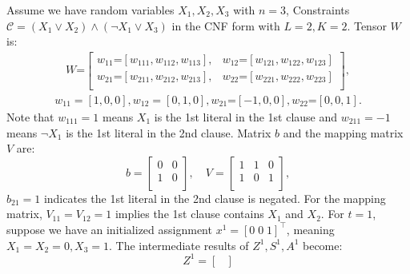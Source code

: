 \begin{example}\label{example:matrix}
    Assume we have random variables $X_1, X_2,X_3$ with $n=3$, Constraints $\mathcal{C}=(X_1\vee X_2)\wedge(\neg X_1 \vee X_3)$ in the CNF form with $L=2,K=2$.
    Tensor $W$ is:
    \begin{equation*}
        \begin{aligned}
            W\mbox{=}\begin{bmatrix}
                         w_{11}\mbox{=}[w_{111}, w_{112}, w_{113}], & w_{12}\mbox{=}[w_{121}, w_{122}, w_{123}] \\
                         w_{21}\mbox{=}[w_{211}, w_{212}, w_{213}], & w_{22}\mbox{=}[w_{221}, w_{222}, w_{223}] \\
                     \end{bmatrix},
        \end{aligned}
    \end{equation*}
    \begin{equation*}
        \begin{aligned}
            w_{11}=[1, 0, 0], w_{12}=[0, 1, 0],  w_{21}\mbox{=}[-1, 0, 0], w_{22}\mbox{=}[0 , 0, 1].
        \end{aligned}
    \end{equation*}
    Note that $w_{111}=1$ means $X_1$ is the 1st literal in the 1st clause and $w_{211}=-1$ means $\neg X_1$ is the 1st literal in the 2nd clause. %
    Matrix $b$ and the mapping matrix $V$ are:
    \begin{equation*}
        b=\begin{bmatrix}
            0 & 0 \\
            1 & 0 \\
        \end{bmatrix},\quad
        V=\begin{bmatrix}
            1 & 1 & 0 \\
            1 & 0 & 1 \\
        \end{bmatrix},
    \end{equation*}
    $b_{21}=1$ indicates the 1st literal in the 2nd clause is negated. For the mapping matrix, $V_{11}=V_{12}=1$ implies the 1st clause contains $X_1$ and $X_2$.
    For $t=1$, suppose we have an initialized assignment $x^1=[0\; 0\; 1]^\top$, meaning $X_1=X_2=0, X_3=1$.
    The intermediate results of  $Z^1,S^1,A^1$ become:
    \begin{equation*}
        Z^1=\begin{bmatrix}

\end{bmatrix}
\end{equation*}
\end{example}
